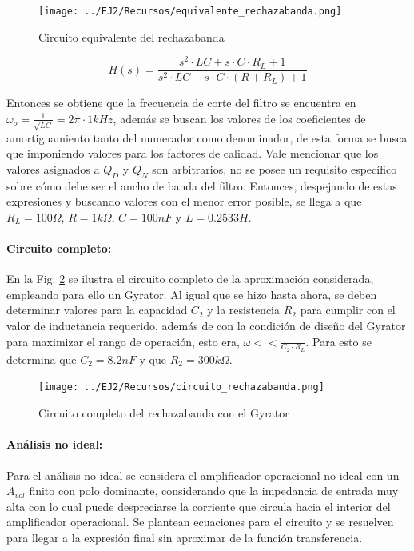\begin{figure}[H]
    \centering
    \texttt{[image: ../EJ2/Recursos/equivalente\_rechazabanda.png]}
    \caption{Circuito equivalente del rechazabanda}
    \label{fig:equivalente_rechazabanda}
\end{figure}

\begin{equation}
    H(s) = \frac{s^{2} \cdot LC + s \cdot C \cdot R_L + 1}{s^{2} \cdot LC + s \cdot C \cdot (R + R_L) + 1}    
\end{equation}

Entonces se obtiene que la frecuencia de corte del filtro se encuentra en $\omega_o = \frac{1}{\sqrt{LC}} = 2\pi \cdot 1kHz$, adem\'as se buscan los valores de los coeficientes de amortiguamiento tanto del numerador como denominador,
de esta forma se busca que imponiendo valores para los factores de calidad. Vale mencionar que los valores asignados a $Q_D$ y $Q_N$ son arbitrarios, no se posee un requisito espec\'ifico sobre c\'omo debe ser el ancho de banda del filtro.
Entonces, despejando de estas expresiones y buscando valores con el menor error posible, se llega a que $R_L = 100 \Omega$, $R = 1k \Omega$, $C = 100nF$ y $L = 0.2533H$.

\paragraph*{Circuito completo:} En la Fig. \ref{fig:circuito_rechazabanda} se ilustra el circuito completo de la aproximaci\'on considerada, empleando para ello un Gyrator. Al igual que se hizo hasta ahora,
se deben determinar valores para la capacidad $C_2$ y la resistencia $R_2$ para cumplir con el valor de inductancia requerido, adem\'as de con la condici\'on de dise\~no del Gyrator para maximizar el rango de operaci\'on, esto era,
$\omega << \frac{1}{C_2 \cdot R_L}$. Para esto se determina que $C_2 = 8.2nF$ y que $R_2 = 300k\Omega$.

\begin{figure}[H]
    \centering
    \texttt{[image: ../EJ2/Recursos/circuito\_rechazabanda.png]}
    \caption{Circuito completo del rechazabanda con el Gyrator}
    \label{fig:circuito_rechazabanda}
\end{figure}

\paragraph*{An\'alisis no ideal:} Para el an\'alisis no ideal se considera el amplificador operacional no ideal con un $A_{vol}$ finito con polo dominante, considerando que la impedancia de entrada muy alta con lo cual puede despreciarse la corriente
que circula hacia el interior del amplificador operacional. Se plantean ecuaciones para el circuito y se resuelven para llegar a la expresi\'on final sin aproximar de la funci\'on transferencia.


